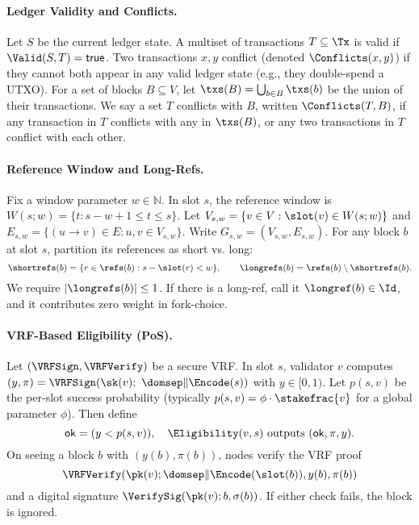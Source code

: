 \paragraph{Ledger Validity and Conflicts.}
Let $S$ be the current ledger state. A multiset of transactions $T\subseteq \Tx$ is valid if $\Valid(S,T)=\textsf{true}$. Two transactions $x,y$ conflict (denoted $\Conflicts(x,y)$) if they cannot both appear in any valid ledger state (e.g., they double-spend a UTXO). For a set of blocks $B\subseteq V$, let $\txs(B)=\bigcup_{b\in B}\txs(b)$ be the union of their transactions. We say a set $T$ conflicts with $B$, written $\Conflicts(T,B)$, if any transaction in $T$ conflicts with any in $\txs(B)$, or any two transactions in $T$ conflict with each other.

\paragraph{Reference Window and Long-Refs.}
Fix a window parameter $w\in\mathbb{N}$. In slot $s$, the reference window is $W(s;w)=\{t: s-w+1\le t \le s\}$. Let $V_{s,w}=\{v\in V: \slot(v)\in W(s;w)\}$ and $E_{s,w}=\{(u\to v)\in E: u,v\in V_{s,w}\}$. Write $G_{s,w}=(V_{s,w},E_{s,w})$. For any block $b$ at slot $s$, partition its references as short vs. long:
\begin{equation*}
\shortrefs(b)=\{r\in\refs(b): s-\slot(r)<w\}, \qquad
\longrefs(b)=\refs(b)\setminus\shortrefs(b).
\end{equation*}
We require $|\longrefs(b)|\le1$. If there is a long-ref, call it $\longref(b)\in\Id$, and it contributes zero weight in fork-choice.

\paragraph{VRF-Based Eligibility (PoS).}
Let $(\VRFSign,\VRFVerify)$ be a secure VRF. In slot $s$, validator $v$ computes $(y,\pi)=\VRFSign(\sk(v);\ \domsep\|\Encode(s))$ with $y\in[0,1)$. Let $p(s,v)$ be the per-slot success probability (typically $p(s,v)=\phi\cdot\stakefrac{v}$ for a global parameter $\phi$). Then define
\begin{equation*}
\mathsf{ok} = (y < p(s,v)),\quad \Eligibility(v,s)\text{ outputs }(\mathsf{ok},\pi,y).
\end{equation*}
On seeing a block $b$ with $(y(b),\pi(b))$, nodes verify the VRF proof $$\VRFVerify(\pk(v);\allowbreak \domsep\|\Encode(\slot(b)), y(b), \pi(b))$$ and a digital signature $\VerifySig(\pk(v); b, \sigma(b))$. If either check fails, the block is ignored.


